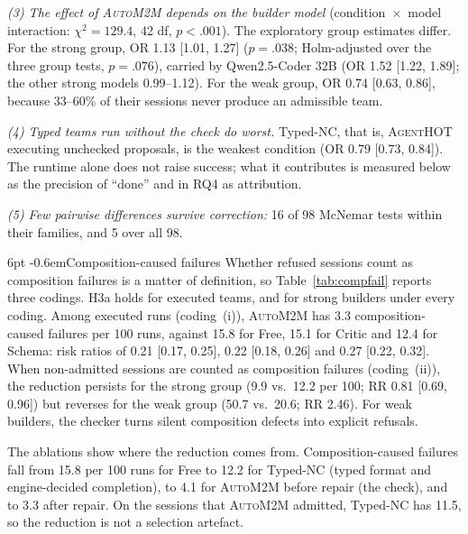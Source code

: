 \documentclass[pdflatex,sn-mathphys-num]{sn-jnl}
\makeatletter
\theoremstyle{thmstyleone}%
\theoremstyle{thmstyletwo}%
\theoremstyle{thmstylethree}%
\newcommand{\tool}{\textsc{AgentHOT}}
\newcommand{\auto}{\textsc{AutoM2M}}
\renewcommand\paragraph{\@startsection{paragraph}{4}{\z@}%
  {6pt \@plus 2pt \@minus 1pt}{-0.6em}{\normalfont\normalsize\bfseries}}
\makeatother
\begin{document}
\emph{(3) The effect of \auto{} depends on the builder model}
(condition~$\times$~model interaction: $\chi^2=129.4$, 42 df, $p<.001$). The
exploratory group estimates differ. For the strong group, OR 1.13 [1.01, 1.27]
($p=.038$; Holm-adjusted over the three group tests, $p=.076$), carried by
Qwen2.5-Coder 32B (OR 1.52 [1.22, 1.89]; the other strong models 0.99--1.12).
For the weak group, OR 0.74 [0.63, 0.86], because 33--60\% of their sessions
never produce an admissible team.

\emph{(4) Typed teams run without the check do worst.} Typed-NC, that is,
\tool{} executing unchecked proposals, is the weakest condition (OR 0.79 [0.73,
0.84]). The runtime alone does not raise success; what it contributes is
measured below as the precision of ``done'' and in RQ4 as attribution.

\emph{(5) Few pairwise differences survive correction:} 16 of 98 McNemar tests
within their families, and 5 over all 98.

\paragraph{Composition-caused failures} Whether refused sessions count as
composition failures is a matter of definition, so Table~\ref{tab:compfail}
reports three codings. H3a holds for executed teams, and for strong builders
under every coding. Among executed runs (coding~(i)), \auto{} has 3.3
composition-caused failures per 100 runs, against 15.8 for Free, 15.1 for
Critic and 12.4 for Schema: risk ratios of 0.21 [0.17, 0.25], 0.22 [0.18, 0.26]
and 0.27 [0.22, 0.32]. When non-admitted sessions are counted as composition
failures (coding~(ii)), the reduction persists for the strong group (9.9
vs.\ 12.2 per 100; RR 0.81 [0.69, 0.96]) but reverses for the weak group (50.7
vs.\ 20.6; RR 2.46). For weak builders, the checker turns silent composition
defects into explicit refusals.

The ablations show where the reduction comes from. Composition-caused failures
fall from 15.8 per 100 runs for Free to 12.2 for Typed-NC (typed format and
engine-decided completion), to 4.1 for \auto{} before repair (the check), and to
3.3 after repair. On the sessions that \auto{} admitted, Typed-NC has 11.5, so
the reduction is not a selection artefact.
\end{document}
